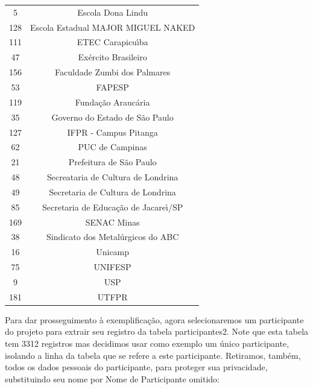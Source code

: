 \documentclass[
12pt,		%
openright,	%
twoside,  %
a4paper,			%
chapter=TITLE,		%
english,			%
french,				%
spanish,			%
brazil				%
]{USPSC-classe/USPSC}
\begin{document}
\begin{table}[htb]
\begin{tabular}{|c|c|}
                    5  &  Escola Dona Lindu \\
                  128  &  Escola Estadual MAJOR MIGUEL NAKED \\
                  111  &  ETEC Carapicu\'{\i}ba \\
                   47  &  Ex\'ercito Brasileiro \\
                  156  &  Faculdade Zumbi dos Palmares \\
                   53  &  FAPESP \\
                  119  &  Funda\c{c}\~ao Arauc\'aria \\
                   35  &  Governo do Estado de S\~ao Paulo \\
                  127  &  IFPR - Campus Pitanga \\
                   62  &  PUC de Campinas \\
                   21  &  Prefeitura de S\~ao Paulo           \\
                   48  &  Secreataria de Cultura de Londrina \\
                   49  &  Secretaria de Cultura de Londrina \\
                   85  &  Secretaria de Educa\c{c}\~ao de Jacare\'{\i}/SP \\
                  169  &  SENAC Minas  \\
                   38  &  Sindicato dos Metal\'urgicos do ABC \\
                   16  &  Unicamp \\
                   75  &  UNIFESP  \\
                    9  &  USP \\
                  181  &  UTFPR \\
\hline
\end{tabular}
\end{table}


Para dar prosseguimento \`a exemplifica\c{c}\~ao, agora selecionaremos um participante do projeto para extrair seu registro da tabela \textquotedbl participantes2\textquotedbl . Note que esta tabela tem 3312 registros mas decidimos usar como exemplo um \'unico participante, isolando a linha da tabela que se refere a este participante. Retiramos, tamb\'em, todos os dados pessoais do participante, para proteger sua privacidade, substituindo seu nome por \textquotedbl Nome de Participante omitido\textquotedbl :
\end{document}
